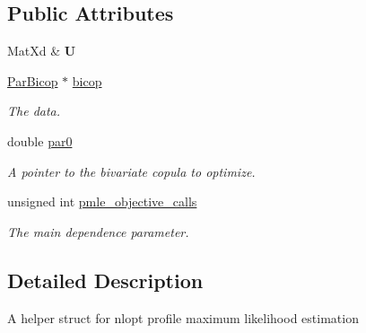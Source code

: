 \subsection*{Public Attributes}
\begin{DoxyCompactItemize}
\item 
\hypertarget{struct_par_bicop_p_m_l_e_data_a1e3c086936bd76d56011ba2421e5bcd0}{Mat\+Xd \& {\bfseries U}}\label{struct_par_bicop_p_m_l_e_data_a1e3c086936bd76d56011ba2421e5bcd0}

\item 
\hypertarget{struct_par_bicop_p_m_l_e_data_a45c8c88af2c9c945952e8a7f904b0a0a}{\hyperlink{class_par_bicop}{Par\+Bicop} $\ast$ \hyperlink{struct_par_bicop_p_m_l_e_data_a45c8c88af2c9c945952e8a7f904b0a0a}{bicop}}\label{struct_par_bicop_p_m_l_e_data_a45c8c88af2c9c945952e8a7f904b0a0a}

\begin{DoxyCompactList}\small\item\em The data. \end{DoxyCompactList}\item 
\hypertarget{struct_par_bicop_p_m_l_e_data_a21666a007414731f6c32d38814d02cf8}{double \hyperlink{struct_par_bicop_p_m_l_e_data_a21666a007414731f6c32d38814d02cf8}{par0}}\label{struct_par_bicop_p_m_l_e_data_a21666a007414731f6c32d38814d02cf8}

\begin{DoxyCompactList}\small\item\em A pointer to the bivariate copula to optimize. \end{DoxyCompactList}\item 
\hypertarget{struct_par_bicop_p_m_l_e_data_a90a2ef2424507c462f8f74a3e5305704}{unsigned int \hyperlink{struct_par_bicop_p_m_l_e_data_a90a2ef2424507c462f8f74a3e5305704}{pmle\+\_\+objective\+\_\+calls}}\label{struct_par_bicop_p_m_l_e_data_a90a2ef2424507c462f8f74a3e5305704}

\begin{DoxyCompactList}\small\item\em The main dependence parameter. \end{DoxyCompactList}\end{DoxyCompactItemize}


\subsection{Detailed Description}
A helper struct for nlopt profile maximum likelihood estimation 